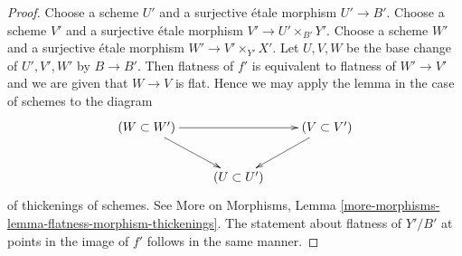 \documentclass[10pt,a4paper]{amsart}
\theoremstyle{plain}
\theoremstyle{definition}
\theoremstyle{remark}
\numberwithin{equation}{subsection}
\begin{document}
\begin{proof}
Choose a scheme $U'$ and a surjective \'etale morphism $U' \to B'$.
Choose a scheme $V'$ and a surjective \'etale morphism
$V' \to U' \times_{B'} Y'$.
Choose a scheme $W'$ and a surjective \'etale morphism
$W' \to V' \times_{Y'} X'$. Let $U, V, W$ be the base change
of $U', V', W'$ by $B \to B'$. Then flatness of $f'$ is
equivalent to flatness of $W' \to V'$ and we are
given that $W \to V$ is flat. Hence we may apply the lemma
in the case of schemes to the diagram
$$
\xymatrix{
(W \subset W') \ar[rr] \ar[rd] & & (V \subset V') \ar[ld] \\
& (U \subset U')
}
$$
of thickenings of schemes. See
More on Morphisms, Lemma
\ref{more-morphisms-lemma-flatness-morphism-thickenings}.
The statement about flatness of $Y'/B'$ at points in the
image of $f'$ follows in the same manner.
\end{proof}
\end{document}
